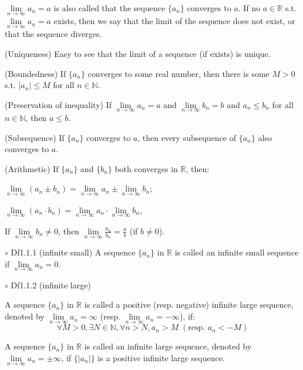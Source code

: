 \documentclass{article}
\begin{document}
\begin{Rmk}{}
    \begin{compactenum}
        \item \textcolor{Df}{$\lim\limits_{n\to\infty}a_n=a$ is also called that the sequence $\{a_n\}$ converges to $a$. If no $a\in\mathbb{R}$ s.t. $\lim\limits_{n\to\infty}a_n=a$ exists, then we say that the limit of the sequence does not exist, or that the sequence diverges.}
        \item \textcolor{Th}{(Uniqueness) Easy to see that the limit of a sequence (if exists) is unique.}
        \item \textcolor{Th}{(Boundedness) If $\{a_n\}$ converges to some real number, then there is some $M>0$ s.t. $|a_n|\leq M$ for all $n\in\mathbb{N}$.}
        \item \textcolor{Th}{(Preservation of inequality) If $\lim\limits_{n\to\infty}a_n=a$ and $\lim\limits_{n\to\infty}b_n=b$ and $a_n\leq b_n$ for all $n\in\mathbb{N}$, then $a\leq b$.}
        \item \textcolor{Th}{(Subsequence) If $\{a_n\}$ converges to $a$, then every subsequence of $\{a_n\}$ also converges to $a$.}
        \item \textcolor{Th}{(Arithmetic) If $\{a_n\}$ and $\{b_n\}$ both converges in $\mathbb{R}$, then:
            \begin{compactitem}
                \item $\lim\limits_{n\to\infty}(a_n\pm b_n)=\lim\limits_{n\to\infty}a_n\pm \lim\limits_{n\to\infty}b_n$; 
                \item $\lim\limits_{n\to\infty}(a_n\cdot b_n)=\lim\limits_{n\to\infty}a_n\cdot \lim\limits_{n\to\infty}b_n$, 
                \item If $\lim\limits_{n\to\infty} b_n\neq 0$, then $\lim\limits_{n\to\infty}\frac{a_n}{b_n}=\frac{a}{b}$ (if $b\neq 0$).
            \end{compactitem}
        }
    \end{compactenum}
\end{Rmk}

\begin{Df}{$\circ$ Df1.1.1 (infinite small)}
    A sequence $\{a_n\}$ in $\mathbb{R}$ is called an infinite small sequence if $\lim\limits_{n\to\infty}a_n=0$.
\end{Df}

\begin{Df}{$\circ$ Df1.1.2 (infinite large)}
    \begin{compactenum}
        \item A sequence $\{a_n\}$ in $\mathbb{R}$ is called a positive (resp. negative) infinite large sequence, denoted by $\lim\limits_{n\to\infty}a_n=\infty$ (resp. $\lim\limits_{n\to\infty}a_n=-\infty$), if:
        $$\forall M>0, \exists N\in\mathbb{N}, \forall n > N, a_n>M \;(\text{resp. } a_n<-M)$$
        \item A sequence $\{a_n\}$ in $\mathbb{R}$ is called an infinite large sequence, denoted by $\lim\limits_{n\to\infty}a_n=\pm\infty$, if $\{|a_n|\}$ is a positive infinite large sequence.
    \end{compactenum}
\end{Df}
\end{document}
